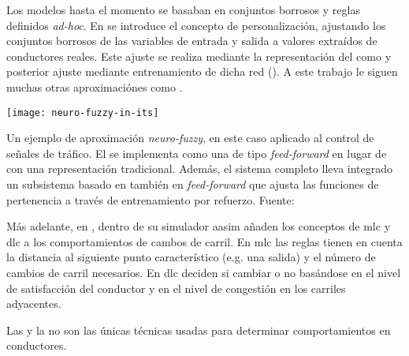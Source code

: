 {Los modelos hasta el momento se basaban en conjuntos borrosos y reglas definidos \textit{ad-hoc}. En \cite{Chakroborty2003} se introduce el concepto de personalización, ajustando los conjuntos borrosos de las variables de entrada y salida a valores extraídos de conductores reales. Este ajuste se realiza mediante la representación del  como  y posterior ajuste mediante entrenamiento de dicha red (\textit{}). A este trabajo le siguen muchas otras aproximaciónes \textit{} como \cite{mbede2004robust, Zheng2005}.

\begin{marginfigure}
	\texttt{[image: neuro-fuzzy-in-its]}
	\caption[Ejemplo de aproximación \textit{neuro-fuzzy} al control de señales de tráfico]{Un ejemplo de aproximación \textit{neuro-fuzzy}, en este caso aplicado al control de señales de tráfico. El  se implementa como una  de tipo \textit{feed-forward} en lugar de con una representación tradicional. Además, el sistema completo lleva integrado un subsistema basado en también en  \textit{feed-forward} que ajusta las funciones de pertenencia a través de entrenamiento por refuerzo. Fuente: \cite{bingham2001reinforcement}}
	\label{fig:neuro-fuzzy-in-its}
\end{marginfigure}

Más adelante, en \cite{Das2009}, dentro de su simulador \gls{aasim} añaden los conceptos de \Acrshort{mlc} y \Acrshort{dlc} a los comportamientos de cambos de carril. En \Acrshort{mlc} las reglas tienen en cuenta la distancia al siguiente punto característico (e.g. una salida) y el número de cambios de carril necesarios. En \Acrshort{dlc} deciden si cambiar o no basándose en el nivel de satisfacción del conductor y en el nivel de congestión en los carriles adyacentes.

Las  y la  no son las únicas técnicas usadas para determinar comportamientos en conductores.

}

